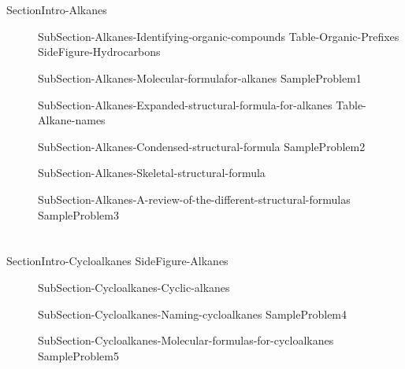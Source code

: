 \documentclass[main.tex]{subfiles}
\begin{document}
\section{\color{blue!30!black}{Alkanes}}
{SectionIntro-Alkanes}
\sloppy\begin{description}
\item[]{SubSection-Alkanes-Identifying-organic-compounds}
{Table-Organic-Prefixes}
{SideFigure-Hydrocarbons}
\item[]{SubSection-Alkanes-Molecular-formulafor-alkanes}
{SampleProblem1}
\item[] {SubSection-Alkanes-Expanded-structural-formula-for-alkanes}\newpage
{Table-Alkane-names}
\item[]{SubSection-Alkanes-Condensed-structural-formula}
{SampleProblem2}
\item[]{SubSection-Alkanes-Skeletal-structural-formula}
\item[]{SubSection-Alkanes-A-review-of-the-different-structural-formulas}
\hspace{-4cm}{Figure-Skeletal-expanded-molecular}
{SampleProblem3}

\end{description}






\section{\color{blue!30!black}{Cycloalkanes}}
{SectionIntro-Cycloalkanes}
{SideFigure-Alkanes}

\sloppy\begin{description}

\item[] {SubSection-Cycloalkanes-Cyclic-alkanes}
\item[]{SubSection-Cycloalkanes-Naming-cycloalkanes}
{SampleProblem4}
\item[]{SubSection-Cycloalkanes-Molecular-formulas-for-cycloalkanes}
{SampleProblem5}
\end{description}
\end{document}
